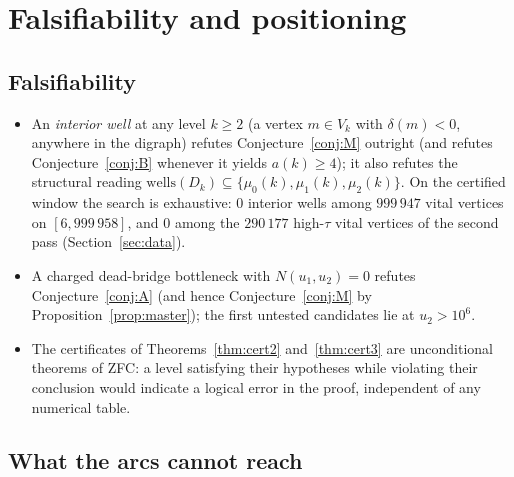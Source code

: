 \documentclass[11pt]{article}
\theoremstyle{plain}
\theoremstyle{definition}
\newcommand{\Vk}{V_{k}}
\newcommand{\Dk}{D_{k}}
\newcommand{\wells}{\mathrm{wells}}
\begin{document}
\section{Falsifiability and positioning}
\label{sec:fals}

\subsection{Falsifiability}

\begin{itemize}
\item An \emph{interior well} at any level $k \ge 2$ (a vertex
      $m \in \Vk$ with $\delta(m) < 0$, anywhere in the
      digraph) refutes Conjecture~\ref{conj:M} outright (and
      refutes Conjecture~\ref{conj:B} whenever it yields
      $a(k) \ge 4$); it also refutes the structural reading
      $\wells(\Dk) \subseteq \{\mu_0(k),\mu_1(k),\mu_2(k)\}$. On the
      certified window the search is exhaustive: $0$ interior wells
      among $999\,947$ vital vertices on $[6, 999\,958]$, and $0$ among the
      $290\,177$ high-$\tau$ vital vertices of the second pass
      (Section~\ref{sec:data}).
\item A charged dead-bridge bottleneck with $N(u_1,u_2) = 0$ refutes
      Conjecture~\ref{conj:A} (and hence Conjecture~\ref{conj:M} by
      Proposition~\ref{prop:master}); the first untested candidates
      lie at $u_2 > 10^{6}$.
\item The certificates of Theorems~\ref{thm:cert2}
      and~\ref{thm:cert3} are unconditional theorems of ZFC: a level
      satisfying their hypotheses while violating their conclusion
      would indicate a logical error in the proof, independent of
      any numerical table.
\end{itemize}

\subsection{What the arcs cannot reach}
\end{document}
